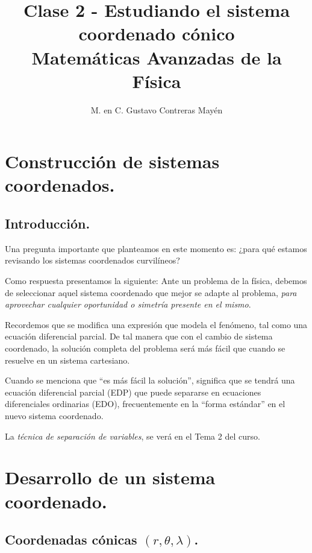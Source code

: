 
\title{Clase 2 - Estudiando el sistema coordenado cónico \\[0.3em]  \large{Matemáticas Avanzadas de la Física}\vspace{-3ex}}
\author{M. en C. Gustavo Contreras Mayén}
\date{ }


\vspace{-4cm}
\maketitle
\fontsize{14}{14}\selectfont
\tableofcontents
\newpage

\section{Construcción de sistemas coordenados.}
\subsection{Introducción.}

Una pregunta importante que planteamos en este momento es: ¿para qué estamos revisando los sistemas coordenados curvilíneos?
\par
Como respuesta presentamos la siguiente: Ante un problema de la física, debemos de seleccionar aquel sistema coordenado que mejor se adapte al problema, \emph{para aprovechar cualquier oportunidad o simetría presente en el mismo}.
\par
Recordemos que se modifica una expresión que modela el fenómeno, tal como una ecuación diferencial parcial. De tal manera que con el cambio de sistema coordenado, la solución completa del problema será más fácil que cuando se resuelve en un sistema cartesiano.
\par
Cuando se menciona que \enquote{es más fácil la solución}, significa que se tendrá una ecuación diferencial parcial (EDP) que puede separarse en ecuaciones diferenciales ordinarias (EDO), frecuentemente en la \enquote{forma estándar} en el nuevo sistema coordenado.
\par
La \emph{técnica de separación de variables}, se verá en el Tema 2 del curso.

\section{Desarrollo de un sistema coordenado.}
\subsection{Coordenadas cónicas \texorpdfstring{$(r, \theta, \lambda)$.}{(r, t, l).}}

